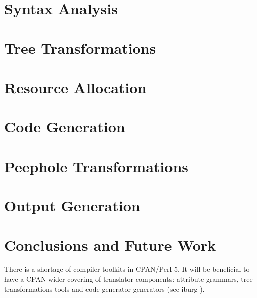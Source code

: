 \documentclass[times, 10pt,twocolumn]{article}
\begin{document}
%

\section{Syntax Analysis}
\label{section:syntacticanalysis}



\section{Tree Transformations}
\label{section:machineindependentoptimizations}



\section{Resource Allocation}
\label{section:addressassign}


\section{Code Generation}
\label{section:codegeneration}


\section{Peephole Transformations}
\label{section:peephole}


\section{Output Generation}
\label{section:output}



\section{Conclusions and Future Work}
There is a shortage of compiler toolkits in CPAN/Perl 5.
It will be beneficial to have a CPAN wider covering of 
translator components: attribute grammars, tree
transformations tools 
and code generator generators (see iburg \cite{iburg}).
\end{document}
